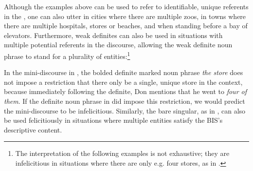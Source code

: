 \documentclass[output=paper,
modfonts
]{langscibook}
\begin{document}
Although the examples above can be used to refer to identifiable, unique referents in the , one can also utter  in cities where there are multiple zoos,  in towns where there are multiple hospitals, stores or beaches, and  when standing before a bay of elevators. Furthermore, weak definites can also be used in situations with multiple potential referents in the discourse, allowing the weak definite noun phrase to stand for a plurality of entities:\footnote{The interpretation of the following examples is not exhaustive; they are infelicitious in situations where there are only e.g. four stores, as in .}

\begin{exe}
\end{exe}

In the mini-discourse in , the bolded definite marked noun phrase \textit{the store} does not impose a restriction that there only be a single, unique store in the context, because immediately following the definite, Don mentions that he went to \textit{four of them}. If the definite noun phrase in  did impose this restriction, we would predict the mini-discourse to be infelicitious. Similarly, the bare singular, as in , can also be used felicitiously in situations where multiple entities satisfy the BIS's descriptive content. 

\begin{exe}
\end{exe}
\end{document}
